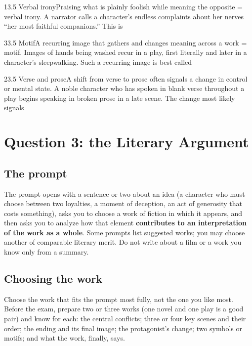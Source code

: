 \documentclass[11pt]{article}
\begin{document}
\begin{q}{1}{3.5 Verbal irony}{Praising what is plainly foolish while meaning the opposite = verbal irony.}
A narrator calls a character's endless complaints about her nerves ``her most faithful companions.'' This is
\end{q}

\begin{q}{3}{3.5 Motif}{A recurring image that gathers and changes meaning across a work = motif.}
Images of hands being washed recur in a play, first literally and later in a character's sleepwalking. Such a recurring image is best called
\end{q}

\begin{q}{2}{3.5 Verse and prose}{A shift from verse to prose often signals a change in control or mental state.}
A noble character who has spoken in blank verse throughout a play begins speaking in broken prose in a late scene. The change most likely signals
\end{q}

\section{Question 3: the Literary Argument}
\label{sec:6}

\subsection{The prompt}
The prompt opens with a sentence or two about an idea (a character who must choose between two loyalties, a moment of deception, an act of generosity that costs something), asks you to choose a work of fiction in which it appears, and then asks you to analyze how that element \textbf{contributes to an interpretation of the work as a whole}. Some prompts list suggested works; you may choose another of comparable literary merit. Do not write about a film or a work you know only from a summary.

\subsection{Choosing the work}
Choose the work that fits the prompt most fully, not the one you like most. Before the exam, prepare two or three works (one novel and one play is a good pair) and know for each: the central conflicts; three or four key scenes and their order; the ending and its final image; the protagonist's change; two symbols or motifs; and what the work, finally, says.
\end{document}
